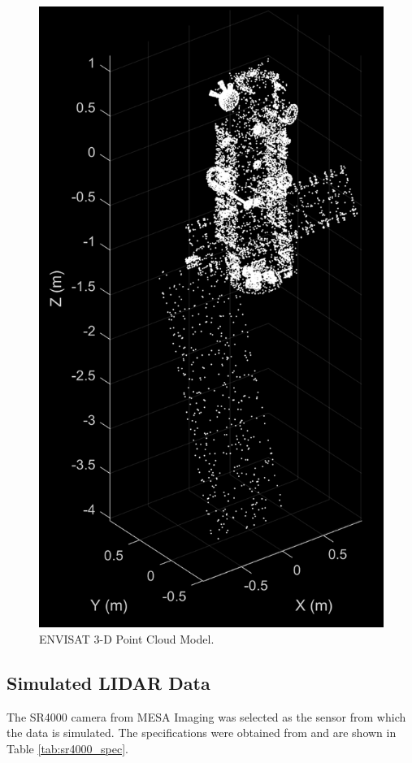 \documentclass[conference]{IEEEtran}
\begin{document}
		\begin{figure}[htbp]
			\centerline{\includegraphics[scale=0.8]{Images/point_cloud_model_black_white.PNG}}
			\caption{ENVISAT 3-D Point Cloud Model.}
			\label{3d_model}
		\end{figure}


	\subsection{Simulated LIDAR Data}
		The SR4000 camera from MESA Imaging was selected as the sensor from which the data is simulated. The specifications were obtained from \cite{camera_specs} and are shown in Table \ref{tab:sr4000_spec}.
\end{document}
